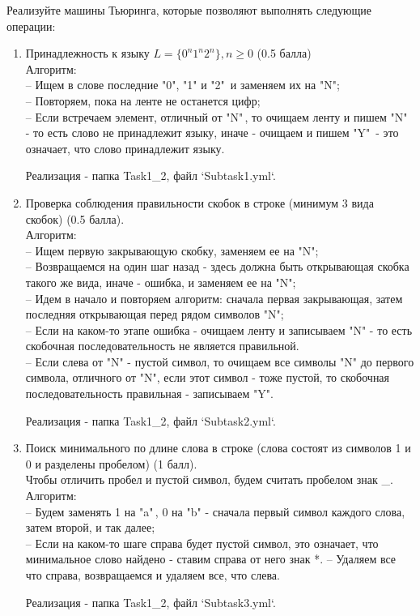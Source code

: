 \documentclass{article}
\begin{document}
Реализуйте машины Тьюринга, которые позволяют выполнять следующие операции:
\begin{enumerate}
    \item Принадлежность к языку $L = \{ 0^n1^n2^n \}, n \ge 0$ (0.5 балла)\\
    Алгоритм: \\
    -- Ищем в слове последние "0", "1" и "2"\, и заменяем их на "N";\\
    -- Повторяем, пока на ленте не останется цифр;\\
    -- Если встречаем элемент, отличный от "N"\,, то очищаем ленту и пишем "N"\, - то есть слово не принадлежит языку, иначе - очищаем и пишем "Y"\, - это означает, что слово принадлежит языку.
    
    Реализация - папка Task1\_2, файл `Subtask1.yml`.
    
    \item Проверка соблюдения правильности скобок в строке (минимум 3 вида скобок) (0.5 балла).\\
    Алгоритм: \\
    -- Ищем первую закрывающую скобку, заменяем ее на "N";\\
    -- Возвращаемся на один шаг назад - здесь должна быть открывающая скобка такого же вида, иначе - ошибка, и заменяем ее на "N";\\
    -- Идем в начало и повторяем алгоритм: сначала первая закрывающая, затем последняя открывающая перед рядом символов "N";\\
    -- Если на каком-то этапе ошибка - очищаем ленту и записываем "N" - то есть скобочная последовательность не является правильной.\\
    -- Если слева от "N" - пустой символ, то очищаем все символы "N" до первого символа, отличного от "N", если этот символ - тоже пустой, то скобочная последовательность правильная - записываем "Y".
    
    Реализация - папка Task1\_2, файл `Subtask2.yml`.
    
    \item Поиск минимального по длине слова в строке (слова состоят из символов 1 и 0 и разделены пробелом) (1 балл).\\
    Чтобы отличить пробел и пустой символ, будем считать пробелом знак \_.\\
    Алгоритм: \\
    -- Будем заменять 1 на "a"\,, 0 на "b" - сначала первый символ каждого слова, затем второй, и так далее;\\
    -- Если на каком-то шаге справа будет пустой символ, это означает, что минимальное слово найдено - ставим справа от него знак *.
    -- Удаляем все что справа, возвращаемся и удаляем все, что слева.
    
    Реализация - папка Task1\_2, файл `Subtask3.yml`.
\end{enumerate}
\end{document}
